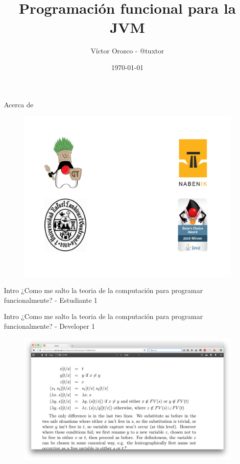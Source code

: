 \documentclass[14pt]{beamer}
\title{Programación funcional para la JVM}
\author{Víctor Orozco - @tuxtor}
\institute{Nabenik}
\date{\today}
\begin{document}
\frame{\titlepage}



\begin{frame}{Acerca de}
\begin{figure}
	\centering
	\includegraphics[width=\linewidth]{Images/fescudos}
\end{figure}

\end{frame}

\begin{frame}{Intro}
    \huge ¿Como me salto la teoria de la computación para programar funcionalmente? - Estudiante 1
\end{frame}

\begin{frame}{Intro}
    \huge ¿Como me salto la teoria de la computación para programar funcionalmente? - Developer 1
\end{frame}

\begin{figure}
    \centering
    \includegraphics[width=\linewidth]{Images/calculus}
\end{figure}
\end{document}
